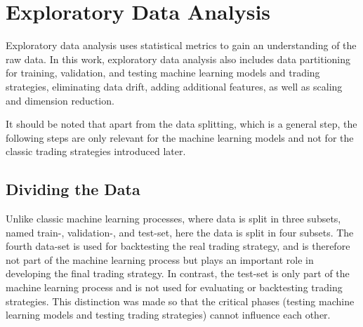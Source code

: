 \section{Exploratory Data Analysis}
\label{chap:eda}

Exploratory data analysis uses statistical metrics to gain an understanding of the raw data.
In this work, exploratory data analysis also includes data partitioning for training, validation, and testing machine learning models and trading strategies, eliminating data drift, adding additional features, as well as scaling and dimension reduction.

It should be noted that apart from the data splitting, which is a general step, the following steps are only relevant for the machine learning models and not for the classic trading strategies introduced later.

\subsection{Dividing the Data}

Unlike classic machine learning processes, where data is split in three subsets, named train-, validation-, and test-set, here the data is split in four subsets.
The fourth data-set is used for backtesting the real trading strategy, and is therefore not part of the machine learning process but plays an important role in developing the final trading strategy.
In contrast, the test-set is only part of the machine learning process and is not used for evaluating or backtesting trading strategies.
This distinction was made so that the critical phases (testing machine learning models and testing trading strategies) cannot influence each other.

